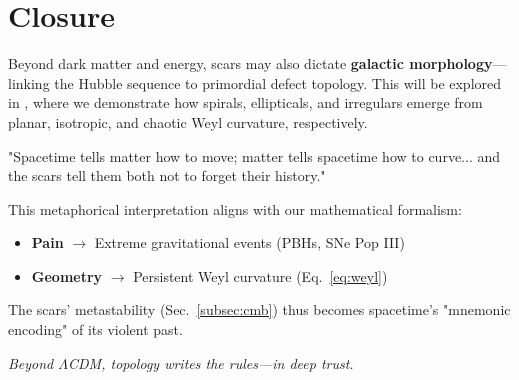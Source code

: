 \documentclass{article}
\begin{document}
\section{Closure}
\label{sec:closure}
\vspace{0.5cm}

Beyond dark matter and energy, scars may also dictate \textbf{galactic morphology}—linking the Hubble sequence to primordial defect topology. This will be explored in \cite{Bertran2024ScarredHubble}, where we demonstrate how spirals, ellipticals, and irregulars emerge from planar, isotropic, and chaotic Weyl curvature, respectively.

\begin{center}
\begin{tcolorbox}[
    colback=boxnormal,
    colframe=blue!50!black,
    boxrule=1pt,
    arc=4pt,
    width=0.9\linewidth,
    fontupper=\itshape
]
\centering
"Spacetime tells matter how to move; matter tells spacetime how to curve... and the scars tell them both not to forget their history."
\end{tcolorbox}
\end{center}
\vspace{0.3cm}

This metaphorical interpretation aligns with our mathematical formalism:  
\begin{itemize}
    \item \textbf{Pain} $\rightarrow$ Extreme gravitational events (PBHs, SNe Pop III)
    \item \textbf{Geometry} $\rightarrow$ Persistent Weyl curvature (Eq.~\ref{eq:weyl})
\end{itemize}
The scars' metastability (Sec.~\ref{subsec:cmb}) thus becomes spacetime's "mnemonic encoding" of its violent past. 

\begin{flushright}
\textit{Beyond $\Lambda$CDM, topology writes the rules—in deep trust.}
\end{flushright}
\end{document}
